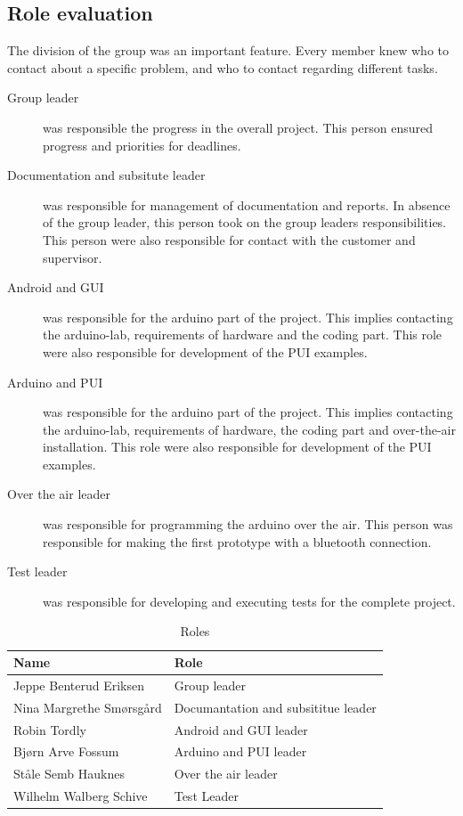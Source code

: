 \subsection{Role evaluation}
The division of the group was an important feature. Every member knew who to contact about a specific problem, and who to contact regarding different tasks.\\

\begin{description}
	\item[Group leader]{was responsible the progress in the overall project. This person ensured progress and priorities for deadlines.}
	\item[Documentation and subsitute leader]{was responsible for management of documentation and reports. In absence of the group leader, this person took on the group leaders responsibilities. This person were also responsible for contact with the customer and supervisor.}
	\item[Android and GUI]{was responsible for the arduino part of the project. This implies contacting the arduino-lab, requirements of hardware and the coding part. This role were also responsible for development of the PUI examples.}
	\item[Arduino and PUI]{was responsible for the arduino part of the project. This implies contacting the arduino-lab, requirements of hardware, the coding part and over-the-air installation. This role were also responsible for development of the PUI examples.}
	\item[Over the air leader]{was responsible for programming the arduino over the air. This person was responsible for making the first prototype with a bluetooth connection.}
	\item[Test leader]{was responsible for developing and executing tests for the complete project.}
\end{description}

\begin{table}
\begin{tabular}{|l|l|}
\hline
	{\bf Name} & {\bf Role}\\
\hline
	Jeppe Benterud Eriksen & Group leader\\
\hline
	Nina Margrethe Smørsgård & Documantation and subsititue leader\\
\hline
	Robin Tordly & Android and GUI leader\\
\hline
	Bjørn Arve Fossum & Arduino and PUI leader\\
\hline
	Ståle Semb Hauknes & Over the air leader\\
\hline
	Wilhelm Walberg Schive & Test Leader\\
\hline
\end{tabular}
\caption{Roles}
\end{table}

